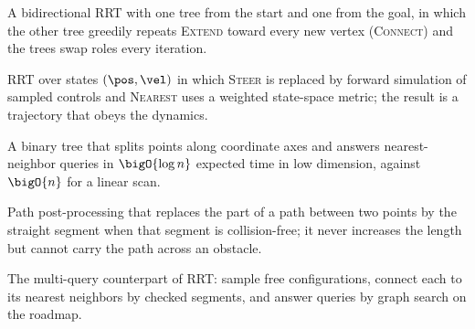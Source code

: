 \item[RRT-Connect] A bidirectional RRT with one tree from the start and one from the goal, in which the other tree greedily repeats \textsc{Extend} toward every new vertex (\textsc{Connect}) and the trees swap roles every iteration.
\item[Kinodynamic RRT] RRT over states $(\pos,\vel)$ in which \textsc{Steer} is replaced by forward simulation of sampled controls and \textsc{Nearest} uses a weighted state-space metric; the result is a trajectory that obeys the dynamics.
\item[kd-tree] A binary tree that splits points along coordinate axes and answers nearest-neighbor queries in $\bigO{\log n}$ expected time in low dimension, against $\bigO{n}$ for a linear scan.
\item[Shortcutting] Path post-processing that replaces the part of a path between two points by the straight segment when that segment is collision-free; it never increases the length but cannot carry the path across an obstacle.
\item[Probabilistic roadmap (PRM)] The multi-query counterpart of RRT: sample free configurations, connect each to its nearest neighbors by checked segments, and answer queries by graph search on the roadmap.
